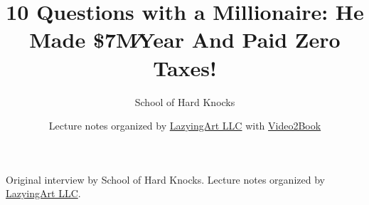 \documentclass[11pt,oneside]{book}
\begin{document}
\frontmatter
\title{10 Questions with a Millionaire: He Made \$7M∕Year And Paid Zero Taxes!}
\author{School of Hard Knocks}
\date{Lecture notes organized by \href{https://lazying.art}{LazyingArt LLC} with \href{https://github.com/lachlanchen/Video2Book}{Video2Book}}
\maketitle
\begin{center}
\small Original interview by School of Hard Knocks. Lecture notes organized by \href{https://lazying.art}{LazyingArt LLC}.
\end{center}
\clearpage
\mainmatter

\end{document}
